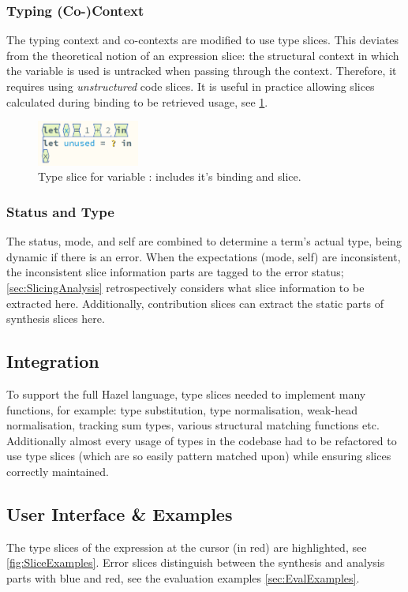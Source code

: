 \subsubsection{Typing (Co-)Context}
The typing context and co-contexts are modified to use type slices. This deviates from the theoretical notion of an expression slice: the structural context in which the variable is used is untracked when passing through the context. Therefore, it requires using \textit{unstructured} code slices. It is useful in practice allowing slices calculated during binding to be retrieved usage, see \cref{fig:VarSlice}.
\begin{figure}[h]
\centering
\includegraphics[width=0.3\textwidth]{Media/Figures/var_slice}
\caption{Type slice for variable : includes it's binding and slice.}
\label{fig:VarSlice}
\end{figure}

\subsubsection{Status and Type}
The status, mode, and self are combined to determine a term's actual type, being dynamic if there is an error. When the expectations (mode, self) are inconsistent, the inconsistent slice information parts are tagged to the error status; \cref{sec:SlicingAnalysis} retrospectively considers what slice information to be extracted here. Additionally, contribution slices can extract the static parts of synthesis slices here. 

\subsection{Integration}
To support the full Hazel language, type slices needed to implement many functions, for example: type substitution, type normalisation, weak-head normalisation, tracking sum types, various structural matching functions etc. Additionally almost every usage of types in the codebase had to be refactored to use type slices (which are so easily pattern matched upon) while ensuring slices correctly maintained.

\subsection{User Interface \& Examples}
The type slices of the expression at the cursor (in red) are highlighted, see \cref{fig:SliceExamples}. Error slices distinguish between the synthesis and analysis parts with blue and red, see the evaluation examples \cref{sec:EvalExamples}.

